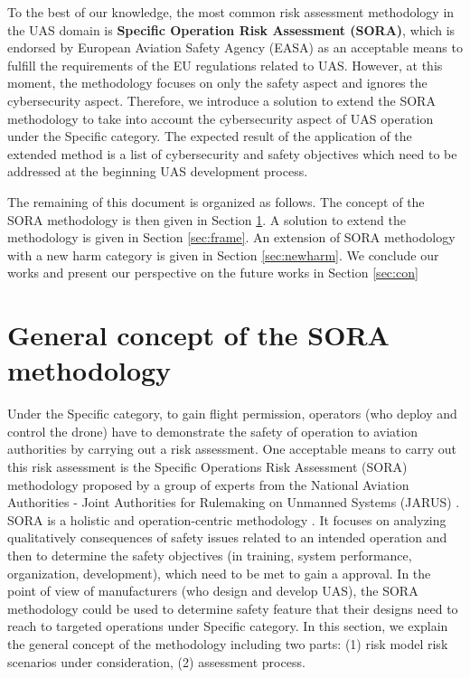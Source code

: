 \documentclass[a4paper, 10, conference]{ieeeconf}  %
\begin{document}
To the best of our knowledge,  the most common risk assessment methodology in the UAS domain is \textbf{Specific Operation Risk Assessment (SORA)}, which is endorsed by European Aviation Safety Agency (EASA) as an acceptable means to fulfill the requirements of the EU regulations related to UAS. However, at this moment, the methodology focuses on only the safety aspect and ignores the cybersecurity aspect\cite{SORAV1}. Therefore, we introduce a solution to extend the SORA methodology to take into account the cybersecurity aspect of UAS operation under the Specific category. The expected result of the application of the extended method is a list of cybersecurity and safety objectives which need to be addressed at the beginning UAS development process. 

The remaining of this document is organized as follows. The concept of the SORA methodology is then given in Section \ref{sec:concept}. A solution to extend the methodology is given in Section \ref{sec:frame}. An extension of SORA methodology with a new harm category is given in Section \ref{sec:newharm}. We conclude our works and present our perspective on the future works in Section \ref{sec:con}


\section{General concept of the SORA methodology} \label{sec:concept}

 Under the Specific category, to gain flight permission, operators (who deploy and control the drone) have to demonstrate the safety of operation to aviation authorities by carrying out a risk assessment. One acceptable means to carry out this risk assessment is the  Specific Operations Risk Assessment (SORA) methodology proposed by a group of experts from the National Aviation Authorities - Joint Authorities for Rulemaking on Unmanned Systems (JARUS) \cite{EASA_AMC, EASA_SORA}. SORA is a holistic and operation-centric methodology \cite{dlr121660}.  It focuses on analyzing qualitatively consequences of safety issues related to an intended operation and then to determine the safety objectives (in training, system performance, organization, development), which need to be met to gain a  approval. In the point of view of manufacturers (who design and develop UAS), the SORA methodology could be used to determine safety feature that their designs need to reach to targeted operations under Specific category. In this section, we explain the general concept of the methodology including two parts: (1) risk model risk scenarios under consideration, (2) assessment process.
\end{document}
